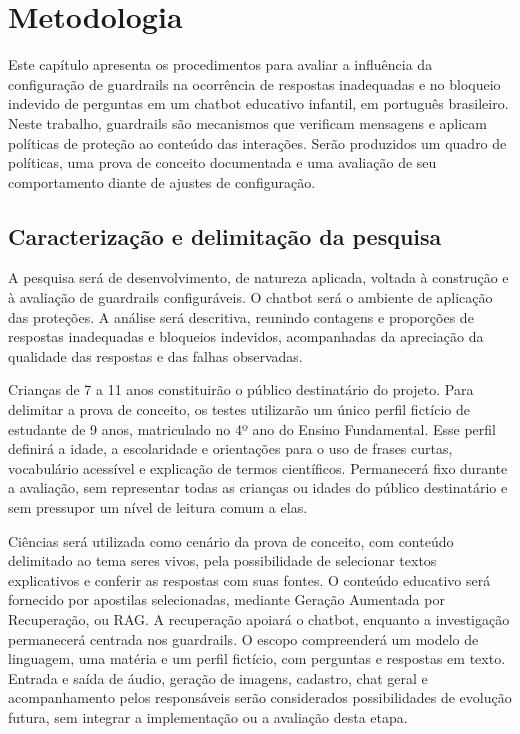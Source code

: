 \documentclass[12pt,openany,oneside,a4paper,english,brazil]{abntex2}
\begin{document}
\frenchspacing
\textual
\setcounter{chapter}{2}
\chapter{Metodologia}\label{cap:metodologia}

Este capítulo apresenta os procedimentos para avaliar a influência da configuração de guardrails na ocorrência de respostas inadequadas e no bloqueio indevido de perguntas em um chatbot educativo infantil, em português brasileiro. Neste trabalho, guardrails são mecanismos que verificam mensagens e aplicam políticas de proteção ao conteúdo das interações. Serão produzidos um quadro de políticas, uma prova de conceito documentada e uma avaliação de seu comportamento diante de ajustes de configuração.

\section{Caracterização e delimitação da pesquisa}\label{sec:caracterizacao}

A pesquisa será de desenvolvimento, de natureza aplicada, voltada à construção e à avaliação de guardrails configuráveis. O chatbot será o ambiente de aplicação das proteções. A análise será descritiva, reunindo contagens e proporções de respostas inadequadas e bloqueios indevidos, acompanhadas da apreciação da qualidade das respostas e das falhas observadas.

Crianças de 7 a 11 anos constituirão o público destinatário do projeto. Para delimitar a prova de conceito, os testes utilizarão um único perfil fictício de estudante de 9 anos, matriculado no 4º ano do Ensino Fundamental. Esse perfil definirá a idade, a escolaridade e orientações para o uso de frases curtas, vocabulário acessível e explicação de termos científicos. Permanecerá fixo durante a avaliação, sem representar todas as crianças ou idades do público destinatário e sem pressupor um nível de leitura comum a elas.

Ciências será utilizada como cenário da prova de conceito, com conteúdo delimitado ao tema seres vivos, pela possibilidade de selecionar textos explicativos e conferir as respostas com suas fontes. O conteúdo educativo será fornecido por apostilas selecionadas, mediante Geração Aumentada por Recuperação, ou RAG. A recuperação apoiará o chatbot, enquanto a investigação permanecerá centrada nos guardrails. O escopo compreenderá um modelo de linguagem, uma matéria e um perfil fictício, com perguntas e respostas em texto. Entrada e saída de áudio, geração de imagens, cadastro, chat geral e acompanhamento pelos responsáveis serão considerados possibilidades de evolução futura, sem integrar a implementação ou a avaliação desta etapa.
\end{document}
